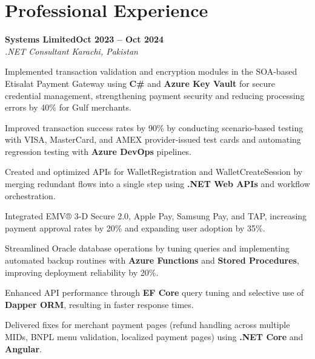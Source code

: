 \documentclass[letterpaper,10pt]{article}
\newcommand{\headingBf}[2]{
  \hspace{10pt}\textbf{#1}\hfill\textbf{#2}\\
}
\newcommand{\headingIt}[2]{
  \hspace{10pt}\textit{#1}\hfill\textit{#2}\\
}
\newenvironment{resume_list}{
  \vspace{-7pt}
  \begin{itemize}[itemsep=-2px, parsep=1pt, leftmargin=30pt]
}{
  \end{itemize}
}
\begin{document}
\section{Professional Experience}

\headingBf{Systems Limited}{Oct 2023 -- Oct 2024}
\headingIt{.NET Consultant \hfill Karachi, Pakistan}{}
\begin{resume_list}
    \item Implemented transaction validation and encryption modules in the SOA-based Etisalat Payment Gateway using \textbf{C\#} and \textbf{Azure Key Vault} for secure credential management, strengthening payment security and reducing processing errors by 40\% for Gulf merchants.
    \item Improved transaction success rates by 90\% by conducting scenario-based testing with VISA, MasterCard, and AMEX provider-issued test cards and automating regression testing with \textbf{Azure DevOps} pipelines.
    \item Created and optimized APIs for WalletRegistration and WalletCreateSession by merging redundant flows into a single step using \textbf{.NET Web APIs} and workflow orchestration.
    \item Integrated EMV® 3-D Secure 2.0, Apple Pay, Samsung Pay, and TAP, increasing payment approval rates by 20\% and expanding user adoption by 35\%.
    \item Streamlined Oracle database operations by tuning queries and implementing automated backup routines with \textbf{Azure Functions} and \textbf{Stored Procedures}, improving deployment reliability by 20\%.
    \item Enhanced API performance through \textbf{EF Core} query tuning and selective use of \textbf{Dapper ORM}, resulting in faster response times.
    \item Delivered fixes for merchant payment pages (refund handling across multiple MIDs, BNPL menu validation, localized payment pages) using \textbf{.NET Core} and \textbf{Angular}.
\end{resume_list}
\end{document}
